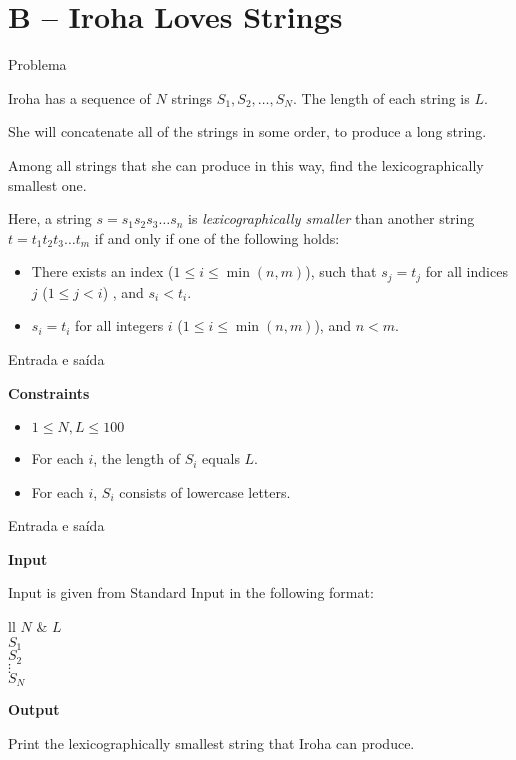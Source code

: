 \section{B -- Iroha Loves Strings}

\begin{frame}[fragile]{Problema}

Iroha has a sequence of $N$ strings $S_1, S_2, \ldots, S_N$.  The length of each string is $L$.

She will concatenate all of the strings in some order, to produce a long string.

Among all strings that she can produce in this way, find the lexicographically smallest one.

Here, a string $s = s_1s_2s_3\ldots s_n$ is \textit{lexicographically smaller} than another string 
$t = t_1t_2t_3\ldots t_m$ if and only if one of the following holds:

\begin{itemize}
    \item There exists an index ($1\leq i\leq \min(n, m)$), such that $s_j = t_j$ for all indices 
        $j$ ($1\leq j < i$) , and $s_i < t_i$.

    \item $s_i = t_i$ for all integers $i$ ($1\leq i\leq \min(n, m)$), and $n < m$.
\end{itemize}

\end{frame}

\begin{frame}[fragile]{Entrada e saída}

\textbf{Constraints}

\begin{itemize}
    \item $1\leq N, L\leq 100$
    \item For each $i$, the length of $S_i$ equals $L$. 
    \item For each $i$, $S_i$ consists of lowercase letters. 
\end{itemize}

\end{frame}

\begin{frame}[fragile]{Entrada e saída}

\textbf{Input}

Input is given from Standard Input in the following format:
\begin{atcoderio}{ll}
$N$ & $L$\\
$S_1$\\
$S_2$\\
$\vdots$\\
$S_N$ \\
\end{atcoderio}

\textbf{Output}

Print the lexicographically smallest string that Iroha can produce.

\end{frame}

